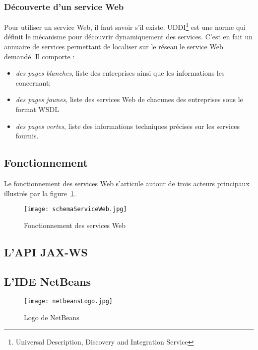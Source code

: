\subsubsection{D\'ecouverte d'un service Web}

Pour utiliser un service Web, il faut savoir s'il existe.
UDDI\protect\footnote{Universal Description, Discovery and Integration Service} est une norme qui d\'efinit le m\'ecanisme pour d\'ecouvrir dynamiquement des services.
C'est en fait un annuaire de services permettant de localiser sur le r\'eseau le service Web demand\'e.
\noindent Il comporte :

\begin{itemize}
	\item \textit{des pages blanches}, liste des entreprises ainsi que les informations les concernant;
	\item \textit{des pages jaunes}, liste des services Web de chacunes des entreprises sous le format WSDL
	\item \textit{des pages vertes}, liste des informations techniques pr\'ecises sur les services fournis.

\end{itemize}


\subsection{Fonctionnement}

Le fonctionnement des services Web s'articule autour de trois acteurs principaux illustr\'es par la figure~\ref{figure:schemaServiceWeb}.

\begin{figure}[!ht]
	\centering
	\texttt{[image: schemaServiceWeb.jpg]}
	\caption{Fonctionnement des services Web}
	\label{figure:schemaServiceWeb}

\end{figure}





\subsection{L'API JAX-WS}

\subsection{L'IDE NetBeans}

\begin{figure}[!ht]
	\centering
	\texttt{[image: netbeansLogo.jpg]}
	\caption{Logo de NetBeans}

\end{figure}

